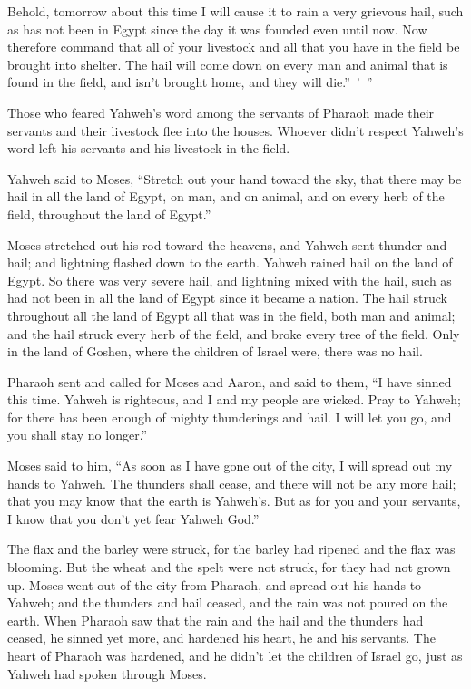 {Behold, tomorrow about this time I will cause it to rain a very grievous hail, such as has not been in Egypt since the day it was founded even until now.
Now therefore command that all of your livestock and all that you have in the field be brought into shelter. The hail will come down on every man and animal that is found in the field, and isn’t brought home, and they will die.” ’ ”
\par }{\PP {}Those who feared Yahweh’s word among the servants of Pharaoh made their servants and their livestock flee into the houses.
Whoever didn’t respect Yahweh’s word left his servants and his livestock in the field.
\par }{\PP {}Yahweh said to Moses, “Stretch out your hand toward the sky, that there may be hail in all the land of Egypt, on man, and on animal, and on every herb of the field, throughout the land of Egypt.”
\par }{\PP {}Moses stretched out his rod toward the heavens, and Yahweh sent thunder and hail; and lightning flashed down to the earth. Yahweh rained hail on the land of Egypt.
So there was very severe hail, and lightning mixed with the hail, such as had not been in all the land of Egypt since it became a nation.
The hail struck throughout all the land of Egypt all that was in the field, both man and animal; and the hail struck every herb of the field, and broke every tree of the field.
Only in the land of Goshen, where the children of Israel were, there was no hail.
\par }{\PP {}Pharaoh sent and called for Moses and Aaron, and said to them, “I have sinned this time. Yahweh is righteous, and I and my people are wicked.
Pray to Yahweh; for there has been enough of mighty thunderings and hail. I will let you go, and you shall stay no longer.”
\par }{\PP {}Moses said to him, “As soon as I have gone out of the city, I will spread out my hands to Yahweh. The thunders shall cease, and there will not be any more hail; that you may know that the earth is Yahweh’s.
But as for you and your servants, I know that you don’t yet fear Yahweh God.”
\par }{\PP {}The flax and the barley were struck, for the barley had ripened and the flax was blooming.
But the wheat and the spelt were not struck, for they had not grown up.
Moses went out of the city from Pharaoh, and spread out his hands to Yahweh; and the thunders and hail ceased, and the rain was not poured on the earth.
When Pharaoh saw that the rain and the hail and the thunders had ceased, he sinned yet more, and hardened his heart, he and his servants.
The heart of Pharaoh was hardened, and he didn’t let the children of Israel go, just as Yahweh had spoken through Moses.

}
